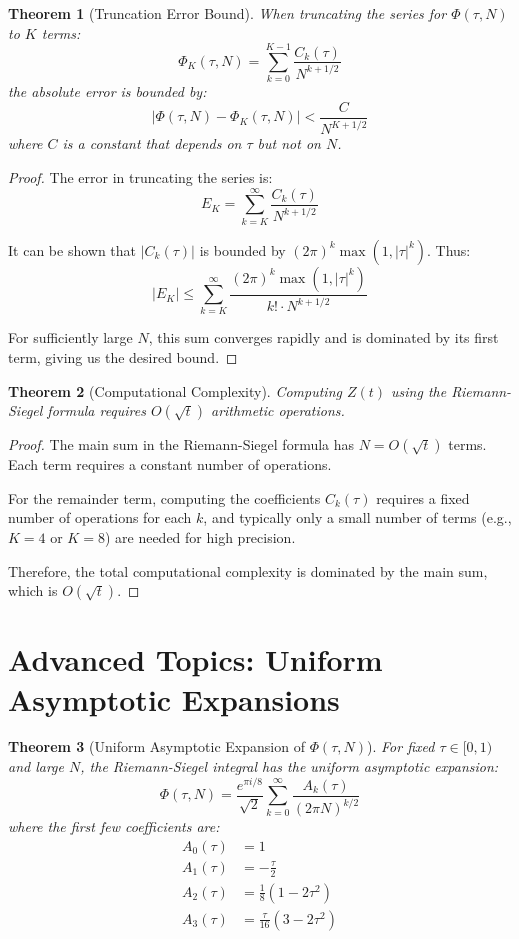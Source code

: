 \documentclass{article}
\newtheorem{theorem}{Theorem}
\begin{document}
\begin{theorem}[Truncation Error Bound]
When truncating the series for $\Phi(\tau, N)$ to $K$ terms:
\[
\Phi_K(\tau, N) = \sum_{k=0}^{K-1} \frac{C_k(\tau)}{N^{k+1/2}}
\]
the absolute error is bounded by:
\[
\left|\Phi(\tau, N) - \Phi_K(\tau, N)\right| < \frac{C}{N^{K+1/2}}
\]
where $C$ is a constant that depends on $\tau$ but not on $N$.
\end{theorem}

\begin{proof}
The error in truncating the series is:
\[
E_K = \sum_{k=K}^{\infty} \frac{C_k(\tau)}{N^{k+1/2}}
\]

It can be shown that $|C_k(\tau)|$ is bounded by $(2\pi)^k \max(1, |\tau|^k)$. Thus:
\[
|E_K| \leq \sum_{k=K}^{\infty} \frac{(2\pi)^k \max(1, |\tau|^k)}{k! \cdot N^{k+1/2}}
\]

For sufficiently large $N$, this sum converges rapidly and is dominated by its first term, giving us the desired bound.
\end{proof}

\begin{theorem}[Computational Complexity]
Computing $Z(t)$ using the Riemann-Siegel formula requires $O(\sqrt{t})$ arithmetic operations.
\end{theorem}

\begin{proof}
The main sum in the Riemann-Siegel formula has $N = O(\sqrt{t})$ terms. Each term requires a constant number of operations.

For the remainder term, computing the coefficients $C_k(\tau)$ requires a fixed number of operations for each $k$, and typically only a small number of terms (e.g., $K = 4$ or $K = 8$) are needed for high precision.

Therefore, the total computational complexity is dominated by the main sum, which is $O(\sqrt{t})$.
\end{proof}

\section{Advanced Topics: Uniform Asymptotic Expansions}

\begin{theorem}[Uniform Asymptotic Expansion of $\Phi(\tau, N)$]
For fixed $\tau \in [0,1)$ and large $N$, the Riemann-Siegel integral has the uniform asymptotic expansion:
\[
\Phi(\tau, N) = \frac{e^{\pi i/8}}{\sqrt{2}} \sum_{k=0}^{\infty} \frac{A_k(\tau)}{(2\pi N)^{k/2}}
\]
where the first few coefficients are:
\begin{align*}
A_0(\tau) &= 1 \\
A_1(\tau) &= -\frac{\tau}{2} \\
A_2(\tau) &= \frac{1}{8}(1-2\tau^2) \\
A_3(\tau) &= \frac{\tau}{16}(3-2\tau^2)
\end{align*}
\end{theorem}
\end{document}
